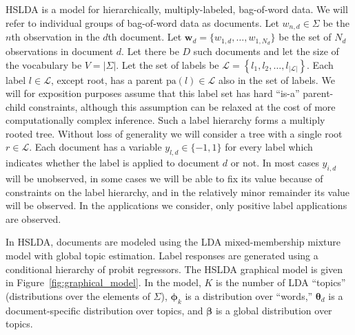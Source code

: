 HSLDA is a model for hierarchically, multiply-labeled, bag-of-word data.  We
will refer to individual groups of bag-of-word data as documents.  Let $w_{n,d}
\in \Sigma$ be the $n$th observation in the $d$th document.  Let $\mathbf{w}_d
= \{w_{1,d},\ldots,w_{1,N_d}\}$ be the  set of $N_d$ observations in document
$d$.  Let there be $D$ such documents and let the size of the vocabulary be
$V=|\Sigma|$.  Let the set of labels be $\mathcal{L}=\left\{
  l_{1},l_{2},\ldots,l_{\left|\mathcal{L}\right|}\right\} $. Each label
$l \in \mathcal{L}$, except root, has a parent $\mathrm{pa}(l) \in \mathcal{L}$
also in the set of labels. 
 We will for exposition purposes assume that this label set has hard ``is-a''
 parent-child constraints, although this assumption can be
 relaxed at the cost of more computationally complex inference.  Such a label hierarchy forms a multiply rooted tree.  Without loss of generality we will consider a tree with a single root $r\in\mathcal{L}$.  Each document has a variable $y_{l,d} \in \{-1,1\}$ for every label which indicates whether the label is applied to document $d$ or not.   In most cases $y_{i,d}$ will be unobserved, in some cases we will be able to fix its value because of  constraints on the label hierarchy, and in the relatively minor remainder its value will be observed.  In the applications we consider, only positive label applications are observed.  


In HSLDA, documents are modeled using the LDA mixed-membership mixture model
with global topic estimation. Label responses are generated using a conditional
hierarchy of probit regressors\cite{gelmanbda04}. The HSLDA graphical model is given in
Figure~\ref{fig:graphical_model}. In the model, $K$ is the number of LDA
``topics'' (distributions over the elements of $\Sigma$), $\boldsymbol\phi_k$
is a distribution over ``words,'' $\boldsymbol\theta_d$ is a document-specific
distribution over topics, and $\boldsymbol\beta$ is a global distribution over
topics.

